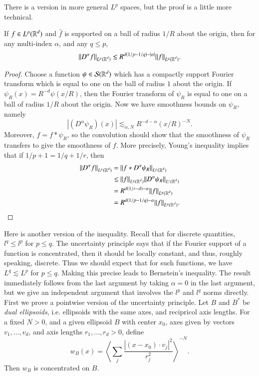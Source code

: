 There is a version in more general $L^p$ spaces, but the proof is a little more technical.

\begin{lemma}
    If $f \in L^p(\operatorname{\mathbb{R}}^d)$ and $\widehat{f}$ is supported on a ball of radius $1/R$ about the origin, then for any multi-index $\alpha$, and any $q \leq p$,
    \[ \| D^\alpha f \|_{L^p(\operatorname{\mathbb{R}}^d)} \lesssim R^{d(1/p - 1/q) - |\alpha|} \| f \|_{L^q(\operatorname{\mathbb{R}}^d)}. \]
\end{lemma}
\begin{proof}
    Choose a function $\psi \in \mathcal{S}(\operatorname{\mathbb{R}}^d)$ which has a compactly support Fourier transform which is equal to one on the ball of radius $1$ about the origin. If $\psi_R(x) = R^{-d} \psi(x / R)$, then the Fourier transform of $\psi_R$ is equal to one on a ball of radius $1/R$ about the origin. Now we have smoothness bounds on $\psi_R$, namely
    \[ |(D^\alpha \psi_R)(x)| \lesssim_{\alpha,N} R^{-d-\alpha} (x/R)^{-N}. \]
    Moreover, $f = f * \psi_R$, so the convolution should show that the smoothness of $\psi_R$ transfers to give the smoothness of $f$. More precisely, Young's inequality implies that if $1/p + 1 = 1/q + 1/r$, then
    \begin{align*}
        \| D^\alpha f \|_{L^p(\operatorname{\mathbb{R}}^d)} &= \| f * D^\alpha \psi_R \|_{L^p(\operatorname{\mathbb{R}}^d)}\\
        &\lesssim \| f \|_{L^q(\operatorname{\mathbb{R}}^d)} \| D^\alpha \psi_R \|_{L^r(\operatorname{\mathbb{R}}^d)}\\
        &= R^{d(1/r - d) - \alpha} \| f \|_{L^q(\operatorname{\mathbb{R}}^d)}\\
        &= R^{d(1/p - 1/q) - \alpha} \| f \|_{L^q(\operatorname{\mathbb{R}}^d)}. \qedhere
    \end{align*}
\end{proof}

Here is another version of the inequality. Recall that for discrete quantities, $l^q \leq l^p$ for $p \leq q$. The uncertainty principle says that if the Fourier support of a function is concentrated, then it should be locally constant, and thus, roughly speaking, discrete. Thus we should expect that for such functions, we have $L^q \lesssim L^p$ for $p \leq q$. Making this precise leads to Bernstein's inequality. The result immediately follows from the last argument by taking $\alpha = 0$ in the last argument, but we give an independent argument that involves the $l^p$ and $l^q$ norms directly. First we prove a pointwise version of the uncertainty principle. Let $B$ and $B^*$ be \emph{dual ellipsoids}, i.e. ellipsoids with the same axes, and recipricol axis lengths. For a fixed $N > 0$, and a given ellipsoid $B$ with center $x_0$, axes given by vectors $v_1,\dots,v_d$, and axis lengths $r_1,\dots,r_d > 0$, define
%
\[ w_B(x) = \left\langle \sum_j \frac{|(x - x_0) \cdot v_j |^2}{r_j^2} \right\rangle^{-N}. \]
%
Then $w_B$ is concentrated on $B$.

